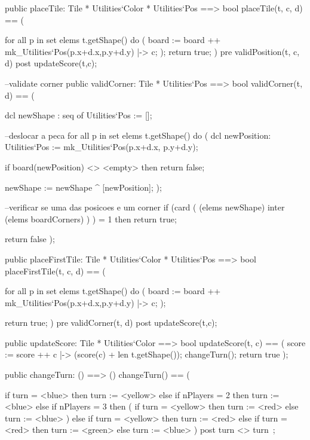 \begin{vdm_al}
        public placeTile: Tile * Utilities`Color * Utilities`Pos ==> bool
          placeTile(t, c, d) == (
          
            for all p in set elems t.getShape() do (
              board := board ++ {mk_Utilities`Pos(p.x+d.x,p.y+d.y) |-> c};
            );
            return true;
          )
        pre validPosition(t, c, d)
        post updateScore(t,c);
        
      --validate corner
        public validCorner: Tile * Utilities`Pos ==> bool
          validCorner(t, d) == (
            
            dcl newShape : seq of Utilities`Pos := [];

            --deslocar a peca
            for all p in set elems t.getShape() do (
              dcl newPosition: Utilities`Pos := mk_Utilities`Pos(p.x+d.x, p.y+d.y);
              
                  if board(newPosition) <> <empty> then
                    return false;

                newShape := newShape ^ [newPosition];
            );
            
            --verificar se uma das posicoes e um corner
            if (card ( (elems newShape) inter (elems boardCorners) ) ) = 1 then
              return true;

            return false
          );
      
        public placeFirstTile: Tile * Utilities`Color * Utilities`Pos ==> bool
        placeFirstTile(t, c, d) == (
          
            for all p in set elems t.getShape() do (  
              board := board ++ {mk_Utilities`Pos(p.x+d.x,p.y+d.y) |-> c};
            );

          return true;
        )
        pre validCorner(t, d)
        post updateScore(t,c);
        
      public updateScore: Tile * Utilities`Color ==> bool
        updateScore(t, c) == (
          score := score ++ {c |-> (score(c) + len t.getShape())};
          changeTurn();
          return true
        );
          
    public changeTurn: () ==> ()
          changeTurn() == (
          
              if turn = <blue> then 
                turn := <yellow>
              else if nPlayers = 2 then
                  turn := <blue>
                else if nPlayers = 3 then (
                  if turn = <yellow> then
                    turn := <red>
                else
                  turn := <blue>
                  )
              else if turn = <yellow> then
                turn := <red>
              else if turn = <red> then
                turn := <green>
            else
              turn := <blue>                
          )
          post turn <> turn~;
        

\end{vdm_al}
